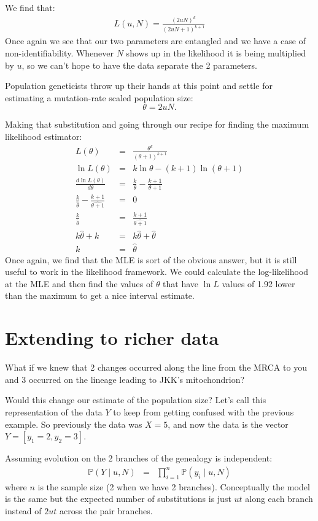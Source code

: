 \documentclass[11pt]{article}
\renewcommand{\Pr}{\mathbb{P}}
\begin{document}
We find that:
\begin{eqnarray}
L(u, N)  = \frac{(2uN)^k}{(2uN + 1)^{k+1}} \label{simplestL}
\end{eqnarray}
Once again we see that our two parameters are entangled and we have a case of non-identifiability.
Whenever $N$ shows up in the likelihood it is being multiplied by $u$, so we can't hope to 
have the data separate the 2 parameters.

Population geneticists throw up their hands at this point and settle for estimating a mutation-rate scaled population size:
$$\theta = 2uN.$$

Making that substitution and going through our recipe for finding the maximum likelihood estimator:
\begin{eqnarray}
L(\theta)  & = & \frac{\theta^k}{(\theta + 1)^{k+1}} \\
\ln L(\theta)  & = & k\ln\theta - (k+1) \ln(\theta + 1) \\
\frac{d\ln L(\theta)}{d\theta} & = & \frac{k}{\theta} - \frac{k + 1}{\theta + 1} \\
\frac{k}{\hat{\theta}} - \frac{k + 1}{\hat{\theta + 1}} & = & 0 \\ 
\frac{k}{\hat{\theta}} & = &  \frac{k + 1}{\hat{\theta + 1}} \\
k\hat{\theta} + k & = & k\hat{\theta} + \hat{\theta} \\
k & = & \hat{\theta}
\end{eqnarray}
Once again, we find that the MLE is sort of the obvious answer, but it is still
useful to work in the likelihood framework.
We could calculate the log-likelihood at the MLE and then find
the values of $\theta$ that have $\ln L$ values of 1.92 lower than the maximum
to get a nice interval estimate.

\section{Extending to richer data}
What if we knew that 2 changes occurred along the line from the MRCA to you and 3 occurred 
on the lineage leading to JKK's mitochondrion?

Would this change our estimate of the population size?
Let's call this representation of the data $Y$ to keep from getting confused with the previous
    example.
So previously the data was $X=5$, and now the data is the vector $Y = [y_1=2, y_2=3]$.

Assuming evolution on the 2 branches of the genealogy is independent:
\begin{eqnarray}
\Pr(Y \mid u, N) & = & \prod_{i=1}^{n} \Pr(y_i \mid u, N)
\end{eqnarray}
where $n$ is the sample size (2 when we have 2 branches).
Conceptually the model is the same but the expected number of substitutions
    is just $ut$ along each branch instead of $2ut$ across the pair branches.
\end{document}
